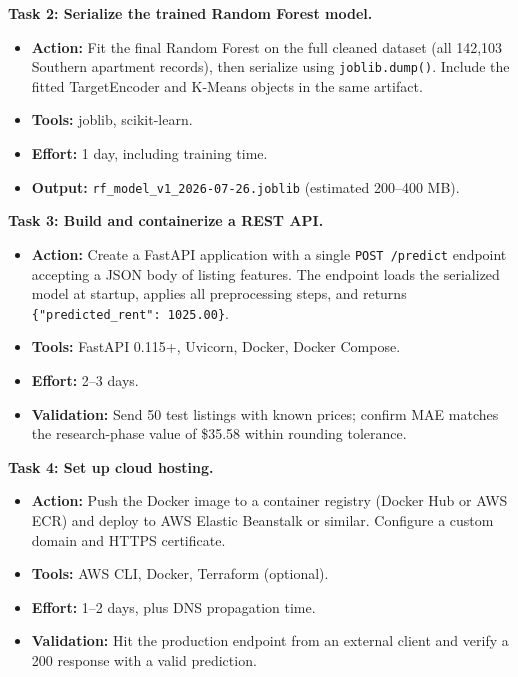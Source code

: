 \medskip\noindent
\textbf{Task 2: Serialize the trained Random Forest model.}
\vspace{-9pt}
\begin{itemize}[itemsep=-9pt]
    \item \textbf{Action:} Fit the final Random Forest on the full cleaned dataset (all 142,103 Southern apartment records), then serialize using \texttt{joblib.dump()}. Include the fitted TargetEncoder and K-Means objects in the same artifact.
    \item \textbf{Tools:} joblib, scikit-learn.
    \item \textbf{Effort:} 1 day, including training time.
    \item \textbf{Output:} \texttt{rf\_model\_v1\_2026-07-26.joblib} (estimated 200--400 MB).
\end{itemize}

\medskip\noindent
\textbf{Task 3: Build and containerize a REST API.}
\vspace{-9pt}
\begin{itemize}[itemsep=-9pt]
    \item \textbf{Action:} Create a FastAPI application with a single \texttt{POST /predict} endpoint accepting a JSON body of listing features. The endpoint loads the serialized model at startup, applies all preprocessing steps, and returns \texttt{\{"predicted\_rent": 1025.00\}}.
    \item \textbf{Tools:} FastAPI 0.115+, Uvicorn, Docker, Docker Compose.
    \item \textbf{Effort:} 2--3 days.
    \item \textbf{Validation:} Send 50 test listings with known prices; confirm MAE matches the research-phase value of \$35.58 within rounding tolerance.
\end{itemize}

\medskip\noindent
\textbf{Task 4: Set up cloud hosting.}
\vspace{-9pt}
\begin{itemize}[itemsep=-9pt]
    \item \textbf{Action:} Push the Docker image to a container registry (Docker Hub or AWS ECR) and deploy to AWS Elastic Beanstalk or similar. Configure a custom domain and HTTPS certificate.
    \item \textbf{Tools:} AWS CLI, Docker, Terraform (optional).
    \item \textbf{Effort:} 1--2 days, plus DNS propagation time.
    \item \textbf{Validation:} Hit the production endpoint from an external client and verify a 200 response with a valid prediction.
\end{itemize}

